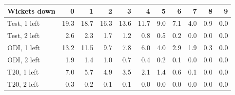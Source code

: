 \begin{tabular}{lrrrrrrrrrr}
\toprule
Wickets down & 0 & 1 & 2 & 3 & 4 & 5 & 6 & 7 & 8 & 9 \\
\midrule
Test, 1 left & 19.3 & 18.7 & 16.3 & 13.6 & 11.7 & 9.0 & 7.1 & 4.0 & 0.9 & 0.0 \\
Test, 2 left & 2.6 & 2.3 & 1.7 & 1.2 & 0.8 & 0.5 & 0.2 & 0.0 & 0.0 & 0.0 \\
ODI, 1 left & 13.2 & 11.5 & 9.7 & 7.8 & 6.0 & 4.0 & 2.9 & 1.9 & 0.3 & 0.0 \\
ODI, 2 left & 1.9 & 1.4 & 1.0 & 0.7 & 0.4 & 0.2 & 0.1 & 0.0 & 0.0 & 0.0 \\
T20, 1 left & 7.0 & 5.7 & 4.9 & 3.5 & 2.1 & 1.4 & 0.6 & 0.1 & 0.0 & 0.0 \\
T20, 2 left & 0.3 & 0.2 & 0.1 & 0.1 & 0.0 & 0.0 & 0.0 & 0.0 & 0.0 & 0.0 \\
\bottomrule
\end{tabular}
